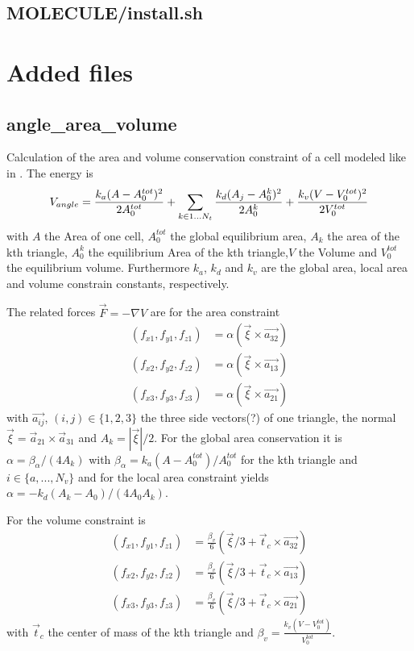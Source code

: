 \documentclass[a4paper,10pt]{scrreprt}
\begin{document}
\section{MOLECULE/install.sh}



\chapter{Added files}


\section{angle\_area\_volume}

Calculation of the area and volume conservation constraint of a cell modeled like in \cite{Fedosov2010}. The energy is
\begin{equation}\label{eq:av}
 V_{angle} = \frac{k_a(A-A_0^{tot})^2}{2A_0^{tot}}+\sum_{k\in 1...N_t}{\frac{k_d(A_j-A^k_0)^2}{2A^k_0}}+\\
\frac{k_v(V-V_0^{tot})^2}{2V_0^{tot}}
\end{equation}
with $A$ the Area of one cell, $A_0^{tot}$ the global equilibrium area, $A_k$ the area of the kth triangle, $A^k_0$ the equilibrium Area of the kth triangle,$V$ the Volume and $V_0^{tot}$ the equilibrium volume. Furthermore $k_a$, $k_d$ and $k_v$ are the global area, local area and volume constrain constants, respectively.

The related forces $\vec{F} = -\nabla V$ are for the area constraint
\begin{align}
(f_{x1}, f_{y1}, f_{z1}) &= \alpha(\vec{\xi}\times\vec{a_{32}}) \nonumber \\
(f_{x2}, f_{y2}, f_{z2}) &= \alpha(\vec{\xi}\times\vec{a_{13}})\\
(f_{x3}, f_{y3}, f_{z3}) &= \alpha(\vec{\xi}\times\vec{a_{21}})\nonumber 
\end{align}
with $\vec{a_{ij}}$, $(i,j)\in \{1,2,3\}$ the three side vectors(?) of one triangle, the normal $\vec{\xi}=\vec{a}_{21}\times\vec{a}_{31}$ and  $A_k= |\vec{\xi}|/2$. For the global area conservation it is $\alpha=\beta_{\alpha}/(4A_k)$ with $\beta_{\alpha}=k_a(A-A_0^{tot})/A_0^{tot}$ for the kth triangle and $i \in \{a,...,N_v\}$ and for the local area constraint yields $\alpha = -k_d(A_k-A_0)/(4A_0A_k)$.

For the volume constraint is
\begin{align}
(f_{x1}, f_{y1}, f_{z1}) &= \frac{\beta_v}{6}(\vec{\xi}/3+\vec{t}_c\times\vec{a_{32}}) \nonumber \\
(f_{x2}, f_{y2}, f_{z2}) &= \frac{\beta_v}{6}(\vec{\xi}/3+\vec{t}_c\times\vec{a_{13}})\\
(f_{x3}, f_{y3}, f_{z3}) &= \frac{\beta_v}{6}(\vec{\xi}/3+\vec{t}_c\times\vec{a_{21}})\nonumber 
\end{align}
with $\vec{t}_c$ the center of mass of the kth triangle and $\beta_v = \frac{k_v(V-V_0^{tot})}{V_0^{tot}}$.
\end{document}
